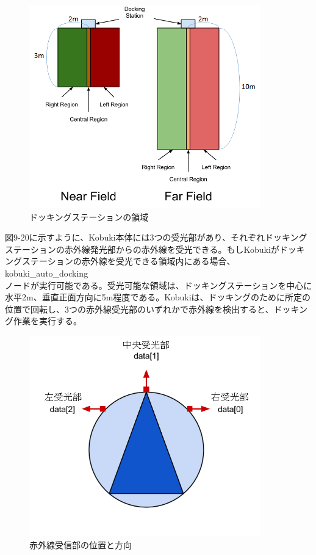 \begin{itemize}
\begin{figure}[htp]
  \centering
  \includegraphics[width=10cm]{pictures/chapter9/pic_09_19.png}
  \caption{ドッキングステーションの領域}
\end{figure}

図9-20に示すように、Kobuki本体には3つの受光部があり、それぞれドッキングステーションの赤外線発光部からの赤外線を受光できる。もしKobukiがドッキングステーションの赤外線を受光できる領域内にある場合、kobuki\_auto\_docking\\ノードが実行可能である。受光可能な領域は、ドッキングステーションを中心に水平2m、垂直正面方向に5m程度である。Kobukiは、ドッキングのために所定の位置で回転し、3つの赤外線受光部のいずれかで赤外線を検出すると、ドッキング作業を実行する。

\begin{figure}[htp]
  \centering
  \includegraphics[width=10cm]{pictures/chapter9/pic_09_20.png}
  \caption{赤外線受信部の位置と方向}
\end{figure}


\end{itemize}
